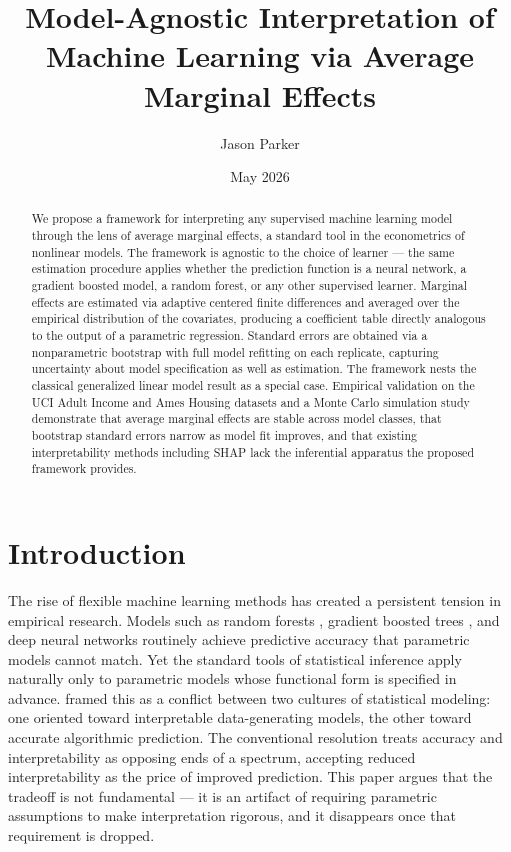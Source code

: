 \documentclass[conference]{IEEEtran}
\begin{document}
	
	\title{Model-Agnostic Interpretation of Machine Learning via Average Marginal Effects}
	\author{Jason Parker}
	\date{May 2026}
	
	\maketitle
	
	\begin{abstract}
		\noindent We propose a framework for interpreting any supervised machine learning model through the lens of average marginal effects, a standard tool in the econometrics of nonlinear models. The framework is agnostic to the choice of learner --- the same estimation procedure applies whether the prediction function is a neural network, a gradient boosted model, a random forest, or any other supervised learner. Marginal effects are estimated via adaptive centered finite differences and averaged over the empirical distribution of the covariates, producing a coefficient table directly analogous to the output of a parametric regression. Standard errors are obtained via a nonparametric bootstrap with full model refitting on each replicate, capturing uncertainty about model specification as well as estimation. The framework nests the classical generalized linear model result as a special case. Empirical validation on the UCI Adult Income and Ames Housing datasets and a Monte Carlo simulation study demonstrate that average marginal effects are stable across model classes, that bootstrap standard errors narrow as model fit improves, and that existing interpretability methods including SHAP lack the inferential apparatus the proposed framework provides.
	\end{abstract}
	
	\section{Introduction}
	
	The rise of flexible machine learning methods has created a persistent tension in empirical research. Models such as random forests \cite{breiman2001rf}, gradient boosted trees \cite{chen2016xgboost}, and deep neural networks \cite{lecun2015deep} routinely achieve predictive accuracy that parametric models cannot match. Yet the standard tools of statistical inference apply naturally only to parametric models whose functional form is specified in advance. \cite{breiman2001cultures} framed this as a conflict between two cultures of statistical modeling: one oriented toward interpretable data-generating models, the other toward accurate algorithmic prediction. The conventional resolution treats accuracy and interpretability as opposing ends of a spectrum, accepting reduced interpretability as the price of improved prediction. This paper argues that the tradeoff is not fundamental --- it is an artifact of requiring parametric assumptions to make interpretation rigorous, and it disappears once that requirement is dropped.
	
\end{document}
